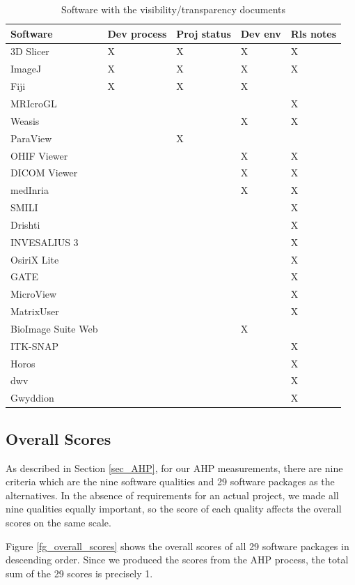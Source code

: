 \documentclass[preprint,12pt,authoryear]{elsarticle}
\begin{document}
\begin{table}[ht]
\centering
\begin{tabular}{lllll}
\hline
Software & Dev process & Proj status & Dev env & Rls notes \\ \hline
3D Slicer & X & X & X & X \\
ImageJ & X & X & X & X \\
Fiji & X & X & X &  \\
MRIcroGL &  &  &  & X \\
Weasis &  &  & X & X \\
ParaView &  & X &  &  \\
OHIF Viewer &  &  & X & X \\
DICOM Viewer &  &  & X & X \\
medInria &  &  & X & X \\
SMILI &  &  &  & X \\
Drishti &  &  &  & X \\
INVESALIUS 3 &  &  &  & X \\
OsiriX Lite &  &  &  & X \\
GATE &  &  &  & X \\
MicroView &  &  &  & X \\
MatrixUser &  &  &  & X \\
BioImage Suite Web &  &  & X &  \\
ITK-SNAP &  &  &  & X \\
Horos &  &  &  & X \\
dwv &  &  &  & X \\
Gwyddion &  &  &  & X \\ \hline
\end{tabular}
\caption{\label{tab_Visibility/Transparency_docs}Software with the visibility/transparency documents}
\end{table}

\subsection{Overall Scores}

As described in Section \ref{sec_AHP}, for our AHP measurements, there are nine
criteria which are the nine software qualities and 29 software packages as the
alternatives. In the absence of requirements for an actual project, we made all
nine qualities equally important, so the score of each quality affects the
overall scores on the same scale.

Figure \ref{fg_overall_scores} shows the overall scores of all 29 software
packages in descending order. Since we produced the scores from the AHP process,
the total sum of the 29 scores is precisely 1.
\end{document}
